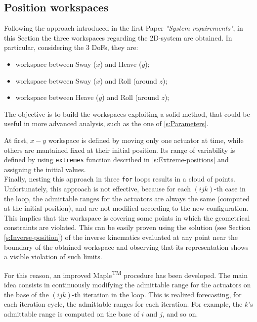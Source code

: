 \documentclass[10.5pt, twocolumn]{article}
\begin{document}
\subsection{Position workspaces}
\label{s:Position-workspaces}
Following the approach introduced in the first Paper \textit{"System requirements"}, in this Section the three workspaces regarding the 2D-system are obtained. In particular, considering the 3 DoFs, they are:
\begin{itemize}
  \item workspace between Sway (\( x \)) and Heave (\( y \));
  \item workspace between Sway (\( x \)) and Roll (around \( z \));
  \item workspace between Heave (\( y \)) and Roll (around \( z \));
\end{itemize}

The objective is to build the workspaces exploiting a solid method, that could be useful in more advanced analysis, such as the one of \ref{s:Parameters}.

At first, \( x-y\) workspace is defined by moving only one actuator at time, while others are mantained fixed at their initial position. Its range of variability is defined by using \texttt{extremes} function described in \ref{s:Extreme-positions} and assigning the initial values.\\
Finally, nesting this approach in three \texttt{for} loops results in a cloud of points. Unfortunately, this approach is not effective, because for each \( (i j k) \)-th case in the loop, the admittable ranges for the actuators are always the same (computed at the initial position), and are not modified according to the new configuration.\\
This implies that the workspace is covering some points in which the geometrical constraints are violated. This can be easily proven using the solution (see Section \ref{s:Inverse-position}) of the inverse kinematics evaluated at any point near the boundary of the obtained workspace and observing that its representation shows a visible violation of such limits.

For this reason, an improved Maple\textsuperscript{TM} procedure has been developed. The main idea consists in continuously modifying the admittable range for the actuators on the base of the \( (i j k) \)-th iteration in the loop. This is realized forecasting, for each iteration cycle, the admittable ranges for each iteration. For example, the \( k \)'s admittable range is computed on the base of \( i \) and \( j \), and so on.
\end{document}
